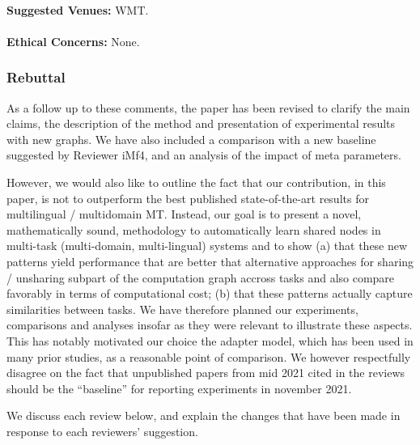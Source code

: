 \documentclass[12pt,times,a4paper,twoside]{article}
\theoremstyle{definition}
\begin{document}
\paragraph{}\textbf{Suggested Venues:} WMT.
\paragraph{}\textbf{Ethical Concerns:} None.

\subsubsection*{Rebuttal}
{
  \color{blue}
  
As a follow up to these comments, the paper has been revised to clarify the main claims, the description of the method and presentation of experimental results with new graphs. We have also included a comparison with a new baseline suggested by Reviewer iMf4, and an analysis of the impact of meta parameters.

However, we would also like to outline the fact that our contribution, in this paper, is not to outperform the best published state-of-the-art results for multilingual / multidomain MT. Instead, our goal is to present a novel, mathematically sound, methodology to automatically learn shared nodes in multi-task (multi-domain, multi-lingual) systems and to show (a) that these new patterns yield performance that are better that alternative approaches for sharing / unsharing subpart of the computation graph accross tasks and also compare favorably in terms of computational cost; (b) that these patterns actually capture similarities between tasks. We have therefore planned our experiments, comparisons and analyses insofar as they were relevant to illustrate these aspects. This has notably motivated our choice the adapter model, which has been used in many prior studies, as a reasonable point of comparison. We however respectfully disagree on the fact that unpublished papers from mid 2021 cited in the reviews should be the ``baseline'' for reporting experiments in november 2021.

We discuss each review below, and explain the changes that have been made in response to each reviewers' suggestion.
}

\end{document}
